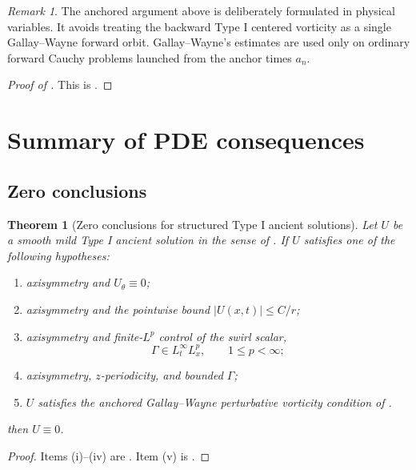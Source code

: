 \documentclass[11pt]{amsart}
\theoremstyle{plain}
\newtheorem{theorem}{Theorem}[section]
\theoremstyle{definition}
\theoremstyle{remark}
\newtheorem{remark}[remark]{Remark}
\numberwithin{equation}{section}
\begin{document}
\begin{remark}
The anchored argument above is deliberately formulated in physical variables.
It avoids treating the backward Type I centered vorticity as a single
Gallay--Wayne forward orbit.  Gallay--Wayne's estimates are used only on
ordinary forward Cauchy problems launched from the anchor times \(a_n\).
\end{remark}

\begin{proof}[Proof of ]
This is .
\end{proof}

\section{Summary of PDE consequences}
\label{p3:sec:summary}

\subsection{Zero conclusions}

\begin{theorem}[Zero conclusions for structured Type I ancient solutions]
\label{p3:thm:typeI-zero-hypotheses}
Let \(U\) be a smooth mild Type I ancient solution in the sense of
.  If \(U\) satisfies one of the following
hypotheses:
\begin{enumerate}[label=\textup{(\roman*)}]
\item axisymmetry and \(U_\theta\equiv0\);
\item axisymmetry and the pointwise bound \(|U(x,t)|\le C/r\);
\item axisymmetry and finite-\(L^p\) control of the swirl scalar,
\[
   \Gamma\in L_t^\infty L_x^p,\qquad 1\le p<\infty;
\]
\item axisymmetry, \(z\)-periodicity, and bounded \(\Gamma\);
\item \(U\) satisfies the anchored Gallay--Wayne perturbative vorticity
condition of .
\end{enumerate}
then \(U\equiv0\).
\end{theorem}

\begin{proof}
Items (i)--(iv) are .  Item (v) is
.
\end{proof}
\end{document}
